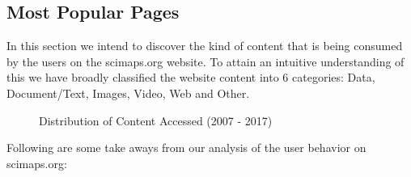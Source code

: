 \subsection{Most Popular Pages} \label{viztoppages}
In this section we intend to discover the kind of content that is being consumed by the users on the scimaps.org website. 
To attain an intuitive understanding of this we have broadly classified the website content into 6 categories:
Data, Document/Text, Images, Video, Web and Other.
\begin{figure}
\centering
{}
\caption{Distribution of Content Accessed (2007 - 2017)}
\label{fig:TopURLs}
\end{figure}
Following are some take aways from our analysis of the user behavior on scimaps.org: 
